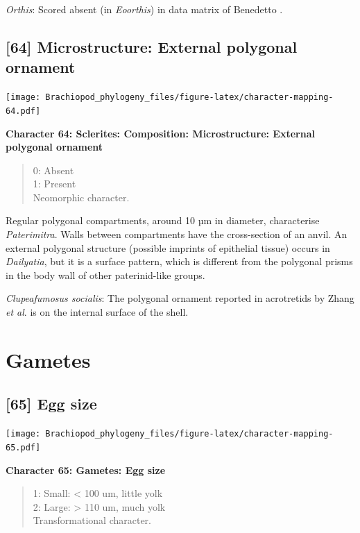\documentclass[openany]{book}
\theoremstyle{definition}
\theoremstyle{definition}
\theoremstyle{definition}
\theoremstyle{remark}
\begin{document}
\hypertarget{Orthis-coding-63}{}
\emph{Orthis}: Scored absent (in \emph{Eoorthis}) in data matrix of
Benedetto \citeyearpar{Benedetto2009iChaniella}.

\subsection*{{[}64{]} Microstructure: External polygonal
ornament}\label{microstructure-external-polygonal-ornament}

\texttt{[image: Brachiopod\_phylogeny\_files/figure-latex/character-mapping-64.pdf]}

\textbf{Character 64: Sclerites: Composition: Microstructure: External
polygonal ornament}

\begin{quote}
0: Absent\\
1: Present\\
Neomorphic character.
\end{quote}

Regular polygonal compartments, around 10 µm in diameter, characterise
\emph{Paterimitra}. Walls between compartments have the cross-section of
an anvil. An external polygonal structure (possible imprints of
epithelial tissue) occurs in \emph{Dailyatia}, but it is a surface
pattern, which is different from the polygonal prisms in the body wall
of other paterinid-like groups.

\hypertarget{Clupeafumosus_socialis-coding-64}{}
\emph{Clupeafumosus socialis}: The polygonal ornament reported in
acrotretids by Zhang \emph{et al}. \citeyearpar{Zhang2016Epithelialcell}
is on the internal surface of the shell.

\section{Gametes}\label{gametes}

\subsection*{{[}65{]} Egg size}\label{egg-size}

\texttt{[image: Brachiopod\_phylogeny\_files/figure-latex/character-mapping-65.pdf]}

\textbf{Character 65: Gametes: Egg size}

\begin{quote}
1: Small: \textless{} 100 um, little yolk\\
2: Large: \textgreater{} 110 um, much yolk\\
Transformational character.
\end{quote}
\end{document}
